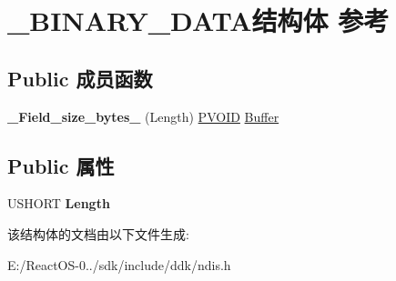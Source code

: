\hypertarget{struct___b_i_n_a_r_y___d_a_t_a}{}\section{\+\_\+\+B\+I\+N\+A\+R\+Y\+\_\+\+D\+A\+T\+A结构体 参考}
\label{struct___b_i_n_a_r_y___d_a_t_a}
\subsection*{Public 成员函数}
\begin{DoxyCompactItemize}
\item 
\mbox{\label{struct___b_i_n_a_r_y___d_a_t_a_a0c96217dc806855ec62da15139bfda76}} 
{\bfseries \+\_\+\+Field\+\_\+size\+\_\+bytes\+\_\+} (Length) \hyperlink{interfacevoid}{P\+V\+O\+ID} \hyperlink{class_buffer}{Buffer}
\end{DoxyCompactItemize}
\subsection*{Public 属性}
\begin{DoxyCompactItemize}
\item 
\mbox{\label{struct___b_i_n_a_r_y___d_a_t_a_a7680376d4ce46c6ff9356d0600445bfb}} 
U\+S\+H\+O\+RT {\bfseries Length}
\end{DoxyCompactItemize}


该结构体的文档由以下文件生成\+:\begin{DoxyCompactItemize}
\item 
E\+:/\+React\+O\+S-\/0../sdk/include/ddk/ndis.\+h\end{DoxyCompactItemize}
